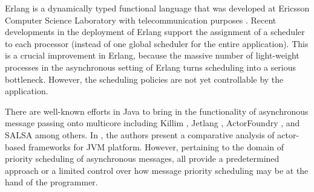 Erlang \cite{erlang:armstrong} is a dynamically typed functional language that
was developed at Ericsson Computer Science Laboratory with telecommunication
purposes \cite{actors_highly:Correa}. Recent developments in the deployment of
Erlang support the assignment of a scheduler to each processor
\cite{erlang_scheduling} (instead of one global scheduler for the entire
application). This is a crucial improvement in Erlang, because the massive
number of light-weight processes in the asynchronous setting of Erlang turns
scheduling into a serious bottleneck. However, the scheduling policies are not
yet controllable by the application. 


There are well-known efforts in Java to bring in the
functionality of asynchronous message passing onto multicore including Killim
\cite{kilim:Srinivasan_Mycroft}, Jetlang \cite{jetlang}, ActorFoundry
\cite{actor_frameworks_jvm:agha}, and SALSA \cite{salsa:agha} among others. In
\cite{actor_frameworks_jvm:agha}, the authors present a comparative analysis of
actor-based frameworks for JVM platform. However, pertaining to the domain of
priority scheduling of asynchronous messages, all provide a predetermined
approach or a limited control over how message priority scheduling may be at the
hand of the programmer.

